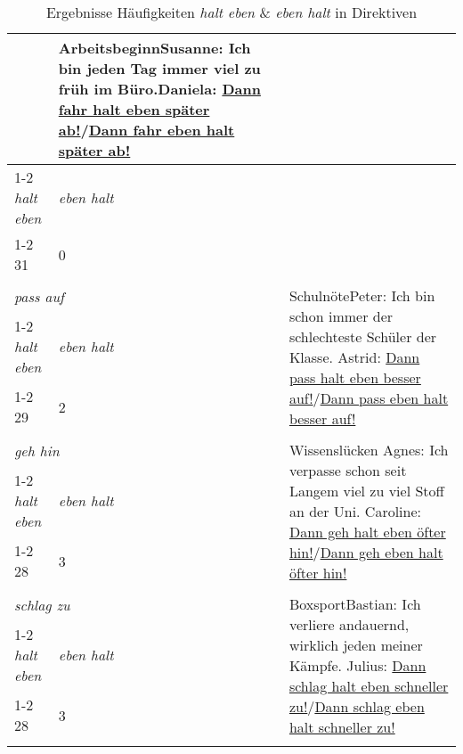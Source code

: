 \begin{table}   \renewcommand{\arraystretch}{1.15}
\caption{\label{tab:636}Ergebnisse Häufigkeiten \emph{halt eben} \& \emph{eben halt} in Direktiven}
\begin{tabularx}{\textwidth}{llX}
\lsptoprule
\multicolumn{2}{l}{{\textit{fahr ab}}}& \multirow{3}{\hsize}{{Arbeitsbeginn}\newline Susanne: Ich bin jeden Tag immer viel zu früh im Büro.\newline Daniela: \ul{Dann fahr halt eben später ab!}/\ul{Dann fahr eben halt später ab!}}\\
\cmidrule(lr){1-2}
\emph{halt eben}& \emph{eben halt} & {}\\
\cmidrule(lr){1-2}
31 & 0 & {}\\
& & \\
\midrule
\multicolumn{2}{l}{{\textit{pass auf}}}& \multirow{3}{\hsize}{{Schulnöte}\newline Peter: Ich bin schon immer der schlechteste Schüler der Klasse. \newline Astrid: \ul{Dann pass halt eben besser auf!}/\ul{Dann pass eben halt besser auf!}}\\
\cmidrule(lr){1-2}
\emph{halt eben}& \emph{eben halt} & {}\\
\cmidrule(lr){1-2}
29 & 2 & {}\\
& & \\
\midrule
\multicolumn{2}{l}{{\textit{geh hin}}}& \multirow{3}{\hsize}{{Wissenslücken
}\newline Agnes: Ich verpasse schon seit Langem viel zu viel Stoff an der Uni.\newline
Caroline: \ul{Dann geh halt eben öfter hin!}/\ul{Dann geh eben halt öfter hin!}}\\
\cmidrule(lr){1-2}
\emph{halt eben}& \emph{eben halt} & {}\\
\cmidrule(lr){1-2}
28 & 3 & {}\\
& & \\
\midrule
\multicolumn{2}{l}{{\textit{schlag zu}}}& \multirow{3}{\hsize}{{Boxsport}\newline Bastian: Ich verliere andauernd, wirklich jeden meiner Kämpfe. \newline Julius: \ul{Dann schlag halt eben schneller zu!}/\ul{Dann schlag eben halt schneller zu!}}\\
\cmidrule(lr){1-2}
\emph{halt eben}& \emph{eben halt} & {}\\
\cmidrule(lr){1-2}
28 & 3 & {}\\
& & \\

\end{tabularx}
\end{table}
